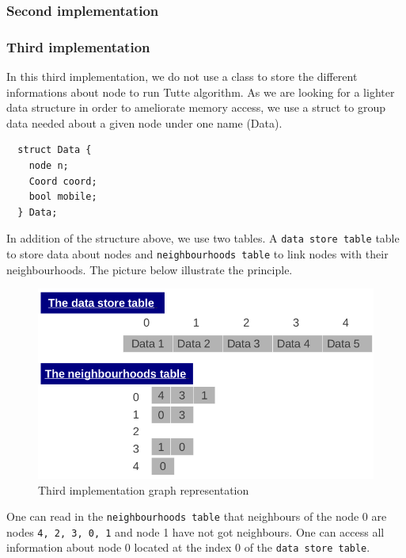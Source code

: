 \subsubsection{Second implementation}

\subsubsection{Third implementation}
In this third implementation, we do not use a class to store the
different informations about node to run Tutte algorithm. 
As we are looking for a lighter data structure in order to ameliorate 
memory access, we use a \textsf{struct} to group data needed about a given node
under one name (\textsf{Data}). 
\begin{lstlisting}
  struct Data {
    node n;
    Coord coord;
    bool mobile;
  } Data;
\end{lstlisting}
In addition of the structure above, we use two tables. A \texttt{data store table} table to store data about nodes and \texttt{neighbourhoods table} to link nodes with their neighbourhoods. The picture below illustrate the principle.
\begin {figure}[H]
  \centering
  \includegraphics[scale=0.5]{img/struct3.png}
  \caption{Third implementation graph representation}
  \label{struct3}
\end {figure}
\noindent One can read in the \texttt{neighbourhoods table} that neighbours of the node 0 are nodes \texttt{4, 2, 3, 0, 1} and node 1 have not got neighbours. One can access all information about node 0 located at the index 0 of the \texttt{data store table}.  
